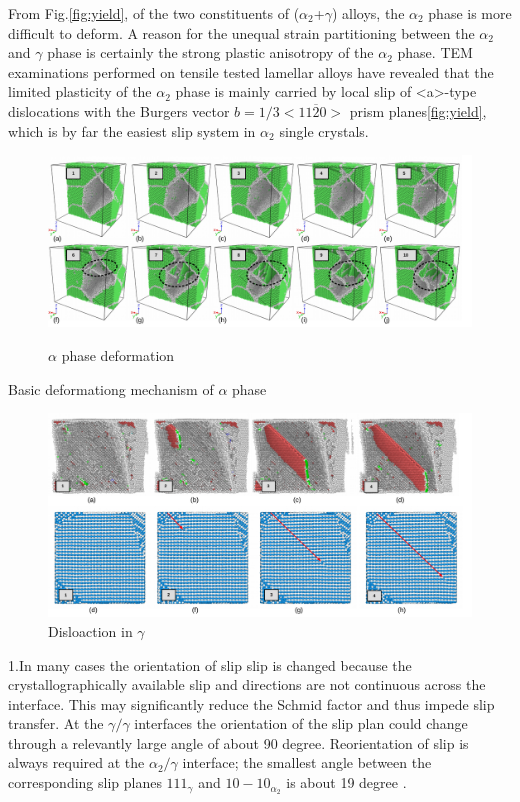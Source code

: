 \documentclass[journal,article,submit,moreauthors,pdftex,10pt,a4paper]{Definitions/mdpi}
\begin{document}
From Fig.\ref{fig:yield}, of the two constituents of ($\alpha_2$+$\gamma$) alloys, the $\alpha_2$ phase is more difficult to deform. A reason for the unequal strain partitioning between the $\alpha_2$ and $\gamma$ phase is certainly the strong plastic anisotropy of the $\alpha_2$ phase. TEM examinations performed on tensile  tested lamellar alloys have revealed that the limited plasticity of the $\alpha_2$ phase is mainly carried by local slip of <a>-type dislocations with the Burgers vector $b=1/3<11\overline{2}0>$ prism planes\ref{fig:yield}, which is by far the easiest slip system in $\alpha_2$ single crystals. 
	\begin{figure}[ht]
		\centering
		\includegraphics[width=1\linewidth]{img/def-alpha}
		\label{fig:def-alpha}
		\caption{$\alpha$ phase deformation}
	\end{figure}
Basic deformationg mechanism of $\alpha$ phase 

	\begin{figure}[ht]
		\centering
		\includegraphics[width=1\linewidth]{"img/disl-gamma"}
		\caption{Disloaction in $\gamma$}
		\label{fig:dis-alpha}
	\end{figure}

1.In many cases the orientation of slip slip is changed because the crystallographically available slip and directions are not continuous across the interface. This may significantly reduce the Schmid factor and thus impede slip transfer. At the $\gamma/\gamma$ interfaces the orientation of the slip plan could change through a relevantly large angle of about 90 degree. Reorientation of slip is always required at the $\alpha_{2}/\gamma$ interface; the smallest angle between the corresponding slip planes ${1 1 1 }_{\gamma}$ and ${ 1 0 -1 0}_{\alpha_2}$ is about 19 degree \cite{}.
	
\end{document}
